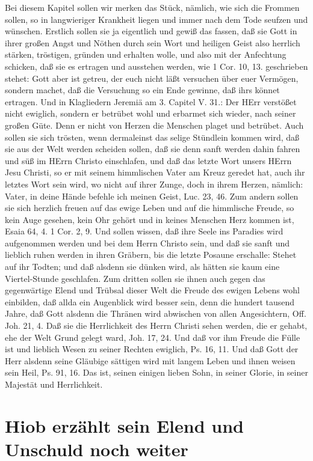 Bei diesem Kapitel sollen wir merken das Stück, nämlich, wie sich die Frommen sollen, so in langwieriger Krankheit liegen und immer nach dem Tode seufzen und wünschen. Erstlich sollen sie ja eigentlich und gewiß das fassen, daß sie Gott in ihrer großen Angst und Nöthen durch sein Wort und heiligen Geist also herrlich stärken, tröstigen, gründen und erhalten wolle, und also mit der Anfechtung schicken, daß sie es ertragen und ausstehen werden, wie 1 Cor. 10, 13. geschrieben stehet: Gott aber ist getreu, der euch nicht läßt versuchen über euer Vermögen, sondern machet, daß die Versuchung so ein Ende gewinne, daß ihrs könnet ertragen. Und in Klagliedern Jeremiä am 3. Capitel V. 31.: Der HErr verstößet nicht ewiglich, sondern er betrübet wohl und erbarmet sich wieder, nach seiner großen Güte. Denn er nicht von Herzen die Menschen plaget und betrübet. Auch sollen sie sich trösten, wenn dermaleinst das selige Stündlein kommen wird, daß sie aus der Welt werden scheiden sollen, daß sie denn sanft werden dahin fahren und süß im HErrn Christo einschlafen, und daß das letzte Wort unsers HErrn Jesu Christi, so er mit seinem himmlischen Vater am Kreuz geredet hat, auch ihr
letztes Wort sein wird, wo nicht auf ihrer Zunge, doch in ihrem Herzen, nämlich: Vater, in deine Hände befehle ich meinen Geist, Luc. 23, 46. Zum andern sollen sie sich herzlich freuen auf das ewige Leben und auf die himmlische Freude, so kein Auge gesehen, kein Ohr gehört und in keines Menschen Herz kommen ist, Esaia 64, 4. 1 Cor. 2, 9. Und sollen wissen, daß ihre Seele ins Paradies wird aufgenommen werden und bei dem Herrn Christo sein, und daß sie sanft und lieblich ruhen werden in ihren Gräbern, bis die letzte Posaune erschalle: Stehet auf ihr Todten; und daß alsdenn sie dünken wird, als hätten sie kaum eine Viertel-Stunde geschlafen. Zum dritten sollen sie ihnen auch gegen das gegenwärtige Elend und Trübsal dieser Welt die Freude des ewigen Lebens wohl einbilden, daß allda ein Augenblick wird besser sein, denn die hundert tausend Jahre, daß Gott alsdenn die Thränen wird abwischen von allen Angesichtern, Off. Joh. 21, 4. Daß sie die Herrlichkeit des Herrn Christi sehen werden, die er gehabt, ehe der Welt Grund gelegt ward, Joh. 17, 24. Und daß vor ihm Freude die Fülle ist und lieblich Wesen zu seiner Rechten ewiglich, Ps. 16, 11. Und daß Gott der Herr alsdenn seine Gläubige sättigen wird mit langem Leben und ihnen weisen sein Heil, Ps. 91, 16. Das ist, seinen einigen lieben Sohn, in seiner Glorie, in seiner Majestät und Herrlichkeit.

\section{Hiob erzählt sein Elend und Unschuld noch weiter}

